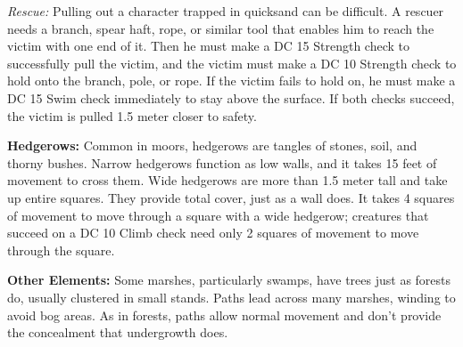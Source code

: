\textit{Rescue:} Pulling out a character trapped in quicksand can be difficult. A rescuer needs a branch, spear haft, rope, or similar tool that enables him to reach the victim with one end of it. Then he must make a DC 15 Strength check to successfully pull the victim, and the victim must make a DC 10 Strength check to hold onto the branch, pole, or rope. If the victim fails to hold on, he must make a DC 15 Swim check immediately to stay above the surface. If both checks succeed, the victim is pulled 1.5 meter closer to safety.

\textbf{Hedgerows:} Common in moors, hedgerows are tangles of stones, soil, and thorny bushes. Narrow hedgerows function as low walls, and it takes 15 feet of movement to cross them. Wide hedgerows are more than 1.5 meter tall and take up entire squares. They provide total cover, just as a wall does. It takes 4 squares of movement to move through a square with a wide hedgerow; creatures that succeed on a DC 10 Climb check need only 2 squares of movement to move through the square.

\textbf{Other Elements:} Some marshes, particularly swamps, have trees just as forests do, usually clustered in small stands. Paths lead across many marshes, winding to avoid bog areas. As in forests, paths allow normal movement and don't provide the concealment that undergrowth does.
